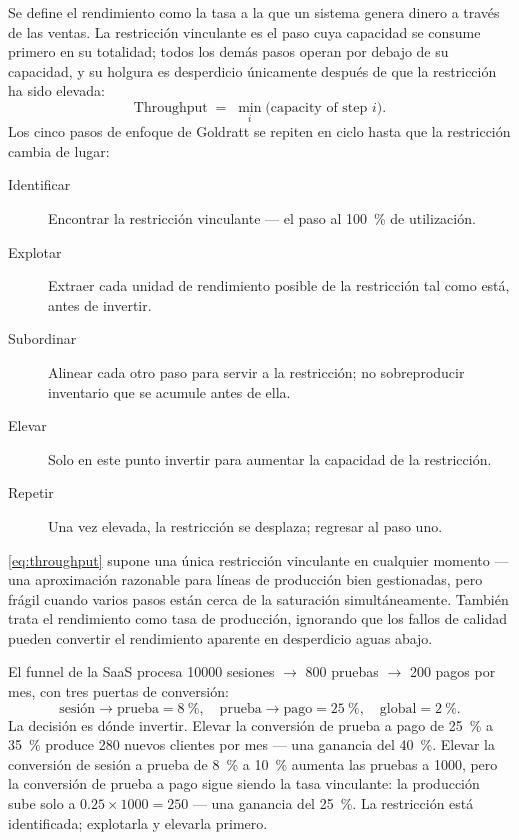 Se define el rendimiento como la tasa a la que un sistema genera dinero a través de las ventas. La restricción vinculante es el paso cuya capacidad se consume primero en su totalidad; todos los demás pasos operan por debajo de su capacidad, y su holgura es desperdicio únicamente después de que la restricción ha sido elevada:
\begin{equation}\label{eq:throughput}
  \text{Throughput} \;=\; \min_{i}\bigl(\text{capacity of step }i\bigr).
\end{equation}
Los cinco pasos de enfoque de Goldratt se repiten en ciclo hasta que la restricción cambia de lugar:
\begin{description}
  \item[Identificar] Encontrar la restricción vinculante --- el paso al \qty{100}{\percent} de utilización.
  \item[Explotar] Extraer cada unidad de rendimiento posible de la restricción tal como está, antes de invertir.
  \item[Subordinar] Alinear cada otro paso para servir a la restricción; no sobreproducir inventario que se acumule antes de ella.
  \item[Elevar] Solo en este punto invertir para aumentar la capacidad de la restricción.
  \item[Repetir] Una vez elevada, la restricción se desplaza; regresar al paso uno.
\end{description}
\cref{eq:throughput} supone una única restricción vinculante en cualquier momento --- una aproximación razonable para líneas de producción bien gestionadas, pero frágil cuando varios pasos están cerca de la saturación simultáneamente. También trata el rendimiento como tasa de producción, ignorando que los fallos de calidad pueden convertir el rendimiento aparente en desperdicio aguas abajo.

\begin{example}
El funnel de la SaaS procesa \num{10000} sesiones \(\to\) \num{800} pruebas \(\to\) \num{200} pagos por mes, con tres puertas de conversión:
\[
  \text{sesión}\to\text{prueba}=\qty{8}{\percent},\quad
  \text{prueba}\to\text{pago}=\qty{25}{\percent},\quad
  \text{global}=\qty{2}{\percent}.
\]
La decisión es dónde invertir. Elevar la conversión de prueba a pago de \qty{25}{\percent} a \qty{35}{\percent} produce \num{280} nuevos clientes por mes --- una ganancia del \qty{40}{\percent}. Elevar la conversión de sesión a prueba de \qty{8}{\percent} a \qty{10}{\percent} aumenta las pruebas a \num{1000}, pero la conversión de prueba a pago sigue siendo la tasa vinculante: la producción sube solo a \(0.25\times1000=250\) --- una ganancia del \qty{25}{\percent}. La restricción está identificada; explotarla y elevarla primero.
\end{example}

